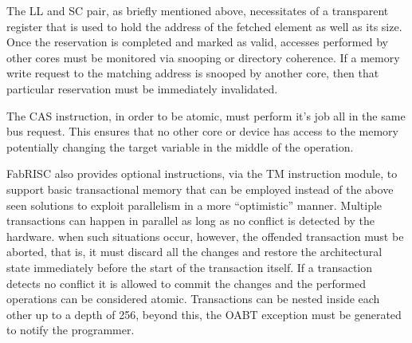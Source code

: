         The LL and SC pair, as briefly mentioned above, necessitates of a transparent register that is used to hold the address of the fetched element as well as its size. Once the reservation is completed and marked as valid, accesses performed by other cores must be monitored via snooping or directory coherence. If a memory write request to the matching address is snooped by another core, then that particular reservation must be immediately invalidated.

        \vspace{10pt}

        The CAS instruction, in order to be atomic, must perform it's job all in the same bus request. This ensures that no other core or device has access to the memory potentially changing the target variable in the middle of the operation.

        \vspace{10pt}

        FabRISC also provides optional instructions, via the TM instruction module, to support basic transactional memory that can be employed instead of the above seen solutions to exploit parallelism in a more ``optimistic'' manner. Multiple transactions can happen in parallel as long as no conflict is detected by the hardware. when such situations occur, however, the offended transaction must be aborted, that is, it must discard all the changes and restore the architectural state immediately before the start of the transaction itself. If a transaction detects no conflict it is allowed to commit the changes and the performed operations can be considered atomic. Transactions can be nested inside each other up to a depth of 256, beyond this, the OABT exception must be generated to notify the programmer.

